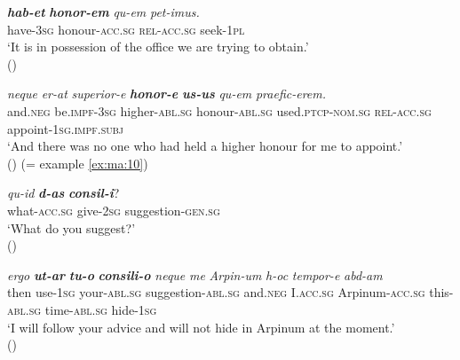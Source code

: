 \documentclass[output=paper,colorlinks,citecolor=brown]{langscibook}
\begin{document}

\ea\label{ex:ma:13}

\ea\label{ex:ma:13a}


\gll \textbf{\itshape hab-et} \textbf{\itshape honor-em} \emph{qu-em} \emph{pet-imus.}\\
have-\textsc{3sg} honour-\textsc{acc.sg} \textsc{rel-acc.sg} seek-\textsc{1pl}\\
\glt `It is in possession of the office we are trying to obtain.' \\
\hspace*{\fill}()

\ex\label{ex:ma:13b}

\gll \emph{neque} \emph{er-at} \emph{superior-e} \textbf{\itshape honor-e}
\textbf{\itshape
  us-us} \emph{qu-em} \emph{praefic-erem.}\\
and.\textsc{neg} be.\textsc{impf-3sg} higher-\textsc{abl.sg} honour-\textsc{abl.sg}
used\textsc{.ptcp}-\textsc{nom.sg} \textsc{rel-acc.sg} appoint-\textsc{1sg.impf.subj}\\
\glt `And there was no one who had held a higher honour for me to appoint.' \\
\hspace*{\fill}() (= example \ref{ex:ma:10})

\z

\z



\ea\label{ex:ma:14}

\ea\label{ex:ma:14a}

\gll \emph{qu-id} \textbf{\itshape d-as} \textbf{\itshape consil-i}?\\
what-\textsc{acc.sg} give-\textsc{2sg} suggestion-\textsc{gen.sg}\\
\glt `What do you suggest?' \\
\hspace*{\fill}()

\ex\label{ex:ma:14b}

\gll \emph{ergo} \textbf{\itshape ut-ar} \textbf{\itshape tu-o} \textbf{\itshape consili-o} \emph{neque} \emph{me} \emph{Arpin-um} \emph{h-oc} \emph{tempor-e} \emph{abd-am}\\
then use-\textsc{1sg} your-\textsc{abl.sg} suggestion-\textsc{abl.sg} and.\textsc{neg}
I.\textsc{acc.sg} Arpinum-\textsc{acc.sg} this-\textsc{abl.sg} time-\textsc{abl.sg}
hide-\textsc{1sg}\\
\glt `I will follow your advice and will not hide in Arpinum at the moment.' \\
\hspace*{\fill}()
\end{document}
